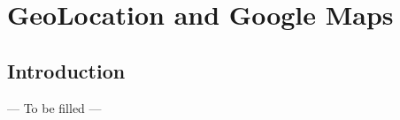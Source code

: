 \chapter{GeoLocation and Google Maps}
\label{GGM}

\section{Introduction}
\label{GGM:introduction}
--- To be filled ---


